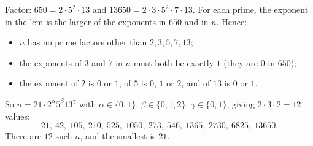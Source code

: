 Factor: $650=2\cdot5^2\cdot13$ and $13650=2\cdot3\cdot5^2\cdot7\cdot13$. For each prime, the exponent in the lcm is the larger of the exponents in $650$ and in $n$. Hence:
\begin{itemize}
\item $n$ has no prime factors other than $2,3,5,7,13$;
\item the exponents of $3$ and $7$ in $n$ must both be exactly $1$ (they are $0$ in $650$);
\item the exponent of $2$ is $0$ or $1$, of $5$ is $0$, $1$ or $2$, and of $13$ is $0$ or $1$.
\end{itemize}
So $n=21\cdot2^{\alpha}5^{\beta}13^{\gamma}$ with $\alpha\in\{0,1\}$, $\beta\in\{0,1,2\}$, $\gamma\in\{0,1\}$, giving $2\cdot3\cdot2=12$ values:
\[
21,\ 42,\ 105,\ 210,\ 525,\ 1050,\ 273,\ 546,\ 1365,\ 2730,\ 6825,\ 13650 .
\]
There are $\boxed{12}$ such $n$, and the smallest is $\boxed{21}$.
